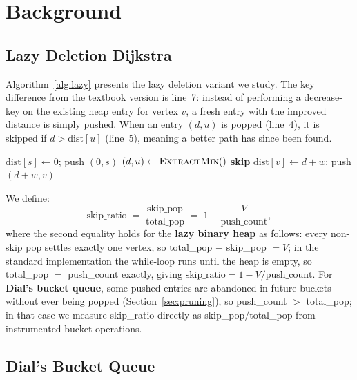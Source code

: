 \documentclass[conference]{IEEEtran}
\begin{document}
\section{Background}
\label{sec:background}

\subsection{Lazy Deletion Dijkstra}

Algorithm~\ref{alg:lazy} presents the lazy deletion variant we study.
The key difference from the textbook version is line~7: instead of
performing a decrease-key on the existing heap entry for vertex $v$, a
fresh entry with the improved distance is simply pushed.  When an entry
$(d, u)$ is popped (line~4), it is skipped if $d > \mathrm{dist}[u]$
(line~5), meaning a better path has since been found.

\begin{algorithm}
\caption{Dijkstra with Lazy Deletion Heap}
\label{alg:lazy}
\begin{algorithmic}[1]
\STATE $\mathrm{dist}[s]\leftarrow 0$;\; push $(0, s)$
  \STATE $(d, u)\leftarrow \textsc{ExtractMin}()$
    \STATE \textbf{skip} 
  \ENDIF
      \STATE $\mathrm{dist}[v]\leftarrow d + w$;\; push $(d+w, v)$
    \ENDIF
  \ENDFOR
\ENDWHILE
\end{algorithmic}
\end{algorithm}

We define:
\[
  \text{skip\_ratio} \;=\; \frac{\text{skip\_pop}}{\text{total\_pop}}
    \;=\; 1 - \frac{V}{\text{push\_count}},
\]
where the second equality holds for the \textbf{lazy binary heap} as
follows: every non-skip pop settles exactly one vertex, so
total\_pop $-$ skip\_pop $= V$; in the standard implementation the
while-loop runs until the heap is empty, so total\_pop $=$ push\_count
exactly, giving $\text{skip\_ratio} = 1 - V/\text{push\_count}$.
For \textbf{Dial's bucket queue}, some pushed entries are abandoned in
future buckets without ever being popped (Section~\ref{sec:pruning}),
so push\_count $>$ total\_pop; in that case we measure skip\_ratio
directly as skip\_pop/total\_pop from instrumented bucket operations.

\subsection{Dial's Bucket Queue}
\end{document}
